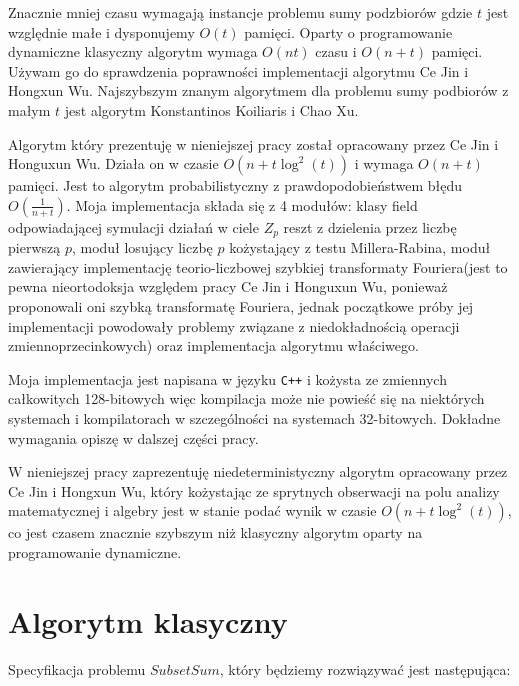 \documentclass{article}
\begin{document}
Znacznie mniej czasu wymagają instancje problemu sumy podzbiorów gdzie $t$ jest względnie małe i dysponujemy
$O(t)$ pamięci. Oparty o programowanie dynamiczne klasyczny algorytm wymaga $O(nt)$ czasu i $O(n+t)$ pamięci.
Używam go do sprawdzenia poprawności implementacji algorytmu Ce Jin i Hongxun Wu. Najszybszym znanym algorytmem 
dla problemu sumy podbiorów z małym $t$ jest algorytm Konstantinos Koiliaris i Chao Xu. 

Algorytm który prezentuję w nieniejszej pracy został opracowany przez Ce Jin i Honguxun Wu. Działa on w czasie 
$O(n+t\log^2(t))$ i wymaga $O(n+t)$ pamięci. Jest to algorytm probabilistyczny z prawdopodobieństwem błędu $O(\frac{1}{n+t})$.
Moja implementacja składa się z 4 modułów: klasy field odpowiadającej symulacji 
działań w ciele $Z_p$ reszt z dzielenia przez liczbę pierwszą $p$, moduł losujący liczbę $p$ kożystający z testu Millera-Rabina,
moduł zawierający implementację teorio-liczbowej szybkiej transformaty Fouriera(jest to pewna nieortodoksja względem pracy
Ce Jin i Honguxun Wu, ponieważ proponowali oni szybką transformatę Fouriera, jednak początkowe próby jej implementacji
powodowały problemy związane z niedokładnością operacji zmiennoprzecinkowych) oraz implementacja algorytmu właściwego.

Moja implementacja jest napisana w języku \texttt{C++} i kożysta ze zmiennych całkowitych 128-bitowych więc kompilacja może nie 
powieść się na niektórych systemach i kompilatorach w szczególności na systemach 32-bitowych. Dokładne wymagania opiszę
w dalszej części pracy.

W nieniejszej pracy zaprezentuję niedeterministyczny algorytm opracowany przez Ce Jin 
i Hongxun Wu, który kożystając ze sprytnych obserwacji na polu analizy matematycznej i algebry jest w 
stanie podać wynik w czasie $O(n+t\log^2(t))$, co jest czasem znacznie szybszym niż klasyczny algorytm 
oparty na programowanie dynamiczne. 



\section{Algorytm klasyczny}
Specyfikacja problemu $SubsetSum$, który będziemy rozwiązywać jest następująca:
\end{document}
